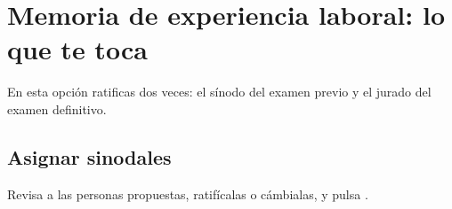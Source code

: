 \section{Memoria de experiencia laboral: lo que te toca}
En esta opción ratificas dos veces: el sínodo del examen previo y el jurado del examen definitivo.
\subsection{Asignar sinodales}
Revisa a las personas propuestas, ratifícalas o cámbialas, y pulsa .
